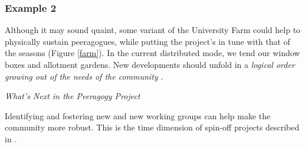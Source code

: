 \subsubsection*{Example 2} Although it may sound quaint, some variant of the University Farm  could help to physically
sustain peeragogues, while putting the project's
 in tune with that of the seasons (Figure \ref{farm}).  In the
current distributed mode, we tend our window boxes and allotment
gardens.  New developments should unfold in a \emph{logical order
  growing out of the needs of the community} \cite[Chapter
  IX]{washington1986up}.

\begin{framed}
\noindent 
\emph{What's Next in the Peeragogy Project}
\begin{collectinmacro}{\HeartbeatWN}{}{}
Identifying and fostering new  and new working groups can help make the community more robust.  This is the time dimension of spin-off projects described in .
\end{collectinmacro}
\HeartbeatWN
\end{framed}


